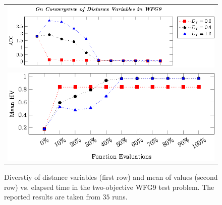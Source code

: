 \begin{figure}[t]
\centering
\begin{tabular}{l}
 \includegraphics[scale=0.8]{images/Diversity_Long_Term_tikz_WFG9-figure0.eps}\\[0cm]%
 \includegraphics[scale=0.8]{images/Diversity_Long_Term_tikz_WFG9-figure1.eps}\\[0cm]%
\end{tabular}
\caption{Diverstiy of distance variables (first row) and mean of \HV{} values (second row) vs. elapsed time in the two-objective WFG9 test problem. The reported results are taken from $35$ runs.}\label{fig:WFG9_Diversity}
\end{figure}


